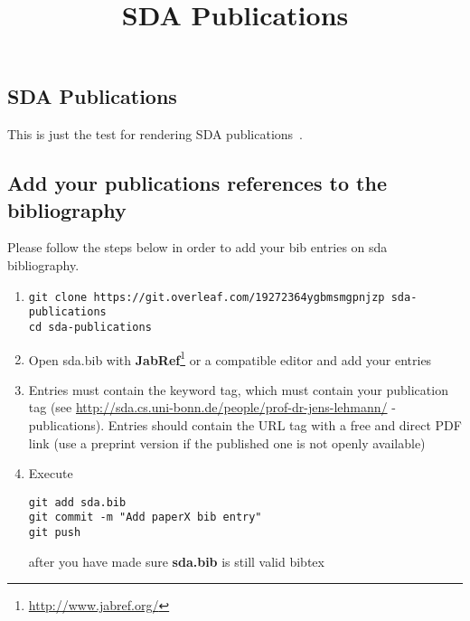\documentclass{article}
\title{SDA Publications}
\begin{document}
\begin{bibunit}[plain]
\section{SDA Publications}
This is just the test for rendering SDA publications~\cite{dbpedia-swj, dllearner_jmlr,lehmann-2017-sansa-iswc}.
\subsection{Add your publications references to the bibliography}
Please follow the steps below in order to add your bib entries on sda bibliography.

\begin{enumerate}
\item 
\begin{verbatim}
git clone https://git.overleaf.com/19272364ygbmsmgpnjzp sda-publications 
cd sda-publications
\end{verbatim}
\item Open sda.bib with \textbf{JabRef}\footnote{\scriptsize{\url{http://www.jabref.org/}}} or a compatible editor and add your entries
\item Entries must contain the keyword tag, which must contain your publication tag (see \url{http://sda.cs.uni-bonn.de/people/prof-dr-jens-lehmann/} - publications).
Entries should contain the URL tag with a free and direct PDF link (use a preprint version if the published one is not openly available)
\item Execute 
\begin{verbatim}
git add sda.bib
git commit -m "Add paperX bib entry"
git push
\end{verbatim}
after you have made sure \textbf{sda.bib} is still valid bibtex
\end{enumerate}
\putbib[sda]
\end{bibunit}


%
%
\end{document}
